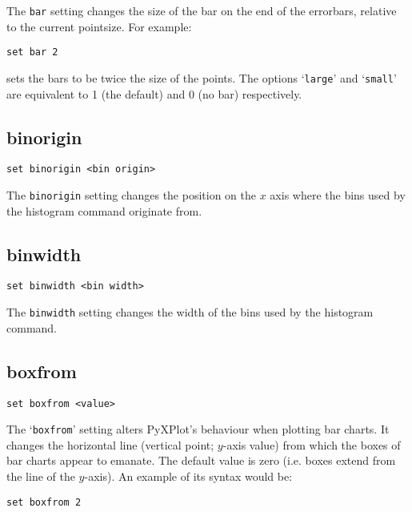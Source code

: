 The {\tt bar} setting changes the size of the bar on the end of the errorbars,
relative to the current pointsize.  For example:

\begin{verbatim}
set bar 2
\end{verbatim}

\noindent sets the bars to be twice the size of the points.  The options `{\tt large}' and
`{\tt small}' are equivalent to 1 (the default) and 0 (no bar) respectively.

\subsection{binorigin}

\begin{verbatim}
set binorigin <bin origin>
\end{verbatim}

The {\tt binorigin} setting changes the position on the $x$ axis where
the bins used by the histogram command originate from.

\subsection{binwidth}

\begin{verbatim}
set binwidth <bin width>
\end{verbatim}

The {\tt binwidth} setting changes the width of the bins used by the histogram
command.

\subsection{boxfrom}

\begin{verbatim}
set boxfrom <value>
\end{verbatim}

The `{\tt boxfrom}' setting alters PyXPlot's behaviour when plotting bar charts.
It changes the horizontal line (vertical point; $y$-axis value) from which the
boxes of bar charts appear to emanate.  The default value is zero (i.e. boxes
extend from the line of the $y$-axis). An example of its syntax would be:

\begin{verbatim}
set boxfrom 2
\end{verbatim}

